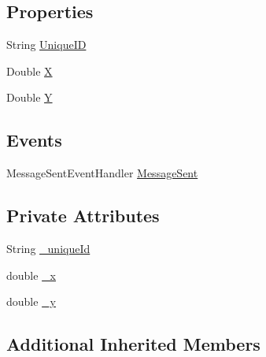 \subsection*{Properties}
\begin{DoxyCompactItemize}
\item 
String \hyperlink{class_web_analyzer_1_1_models_1_1_message_model_1_1_small_data_message_a8ad38d3f87324484d4d9a6ed62656e70}{Unique\+I\+D}
\item 
Double \hyperlink{class_web_analyzer_1_1_models_1_1_message_model_1_1_small_data_message_a26dce64be8d77b383253876ae2bbd06d}{X}
\item 
Double \hyperlink{class_web_analyzer_1_1_models_1_1_message_model_1_1_small_data_message_a4214bf4d6c2c88448e32472cc14f41cd}{Y}
\end{DoxyCompactItemize}
\subsection*{Events}
\begin{DoxyCompactItemize}
\item 
Message\+Sent\+Event\+Handler \hyperlink{class_web_analyzer_1_1_models_1_1_message_model_1_1_small_data_message_a818b24f7d28ba31b0db960023181ed68}{Message\+Sent}
\end{DoxyCompactItemize}
\subsection*{Private Attributes}
\begin{DoxyCompactItemize}
\item 
String \hyperlink{class_web_analyzer_1_1_models_1_1_message_model_1_1_small_data_message_a02f84bd7416e754bb7955a14e5fce9c3}{\+\_\+unique\+Id}
\item 
double \hyperlink{class_web_analyzer_1_1_models_1_1_message_model_1_1_small_data_message_a88d0991ed95524d8e89f945516e859fe}{\+\_\+x}
\item 
double \hyperlink{class_web_analyzer_1_1_models_1_1_message_model_1_1_small_data_message_aa0ed275ee89ea7ba8914cd611aae4c0d}{\+\_\+y}
\end{DoxyCompactItemize}
\subsection*{Additional Inherited Members}


